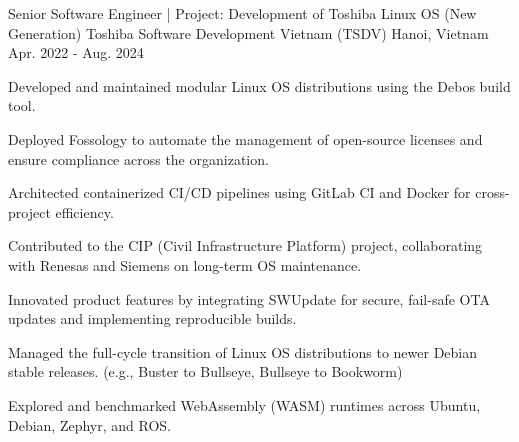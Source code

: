\begin{cventries}
  \cventry
    {Senior Software Engineer | Project: Development of Toshiba Linux OS (New Generation)} %
    {Toshiba Software Development Vietnam (TSDV)} %
    {Hanoi, Vietnam} %
    {Apr. 2022 - Aug. 2024} %
    {
      \begin{cvitems} %
        \item {Developed and maintained modular Linux OS distributions using the Debos build tool.}
        \item {Deployed Fossology to automate the management of open-source licenses and ensure compliance across the organization.}
        \item {Architected containerized CI/CD pipelines using GitLab CI and Docker for cross-project efficiency.}
        \item {Contributed to the CIP (Civil Infrastructure Platform) project, collaborating with Renesas and Siemens on long-term OS maintenance.}
        \item {Innovated product features by integrating SWUpdate for secure, fail-safe OTA updates and implementing reproducible builds.}
        \item {Managed the full-cycle transition of Linux OS distributions to newer Debian stable releases. (e.g., Buster to Bullseye, Bullseye to Bookworm) }
        \item {Explored and benchmarked WebAssembly (WASM) runtimes across Ubuntu, Debian, Zephyr, and ROS.}
      \end{cvitems}
    }


\end{cventries}

